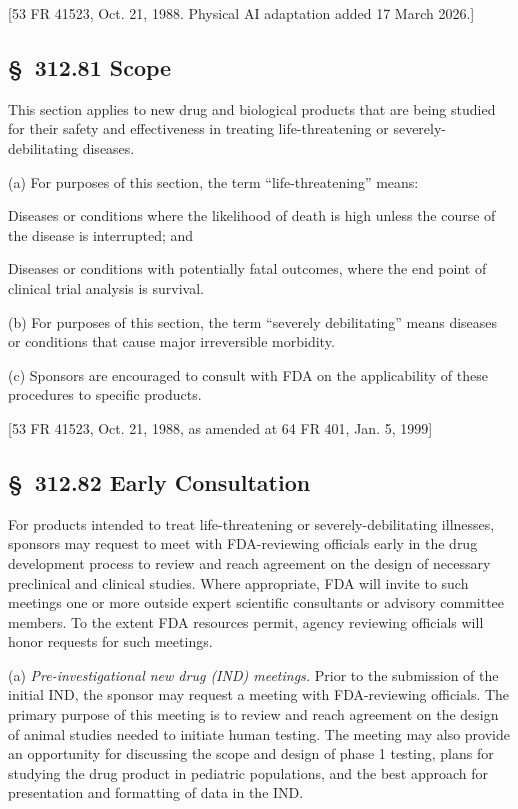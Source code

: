 [53 FR 41523, Oct. 21, 1988. Physical AI adaptation added 17 March 2026.]

\subsection{\S~312.81 Scope}

This section applies to new drug and biological products that are being studied for their safety and effectiveness in treating life-threatening or severely-debilitating diseases.

(a) For purposes of this section, the term ``life-threatening'' means:

\begin{description}[leftmargin=0.5cm,style=sameline]
\item[(1)] Diseases or conditions where the likelihood of death is high unless the course of the disease is interrupted; and
\item[(2)] Diseases or conditions with potentially fatal outcomes, where the end point of clinical trial analysis is survival.
\end{description}

(b) For purposes of this section, the term ``severely debilitating'' means diseases or conditions that cause major irreversible morbidity.

(c) Sponsors are encouraged to consult with FDA on the applicability of these procedures to specific products.

[53 FR 41523, Oct. 21, 1988, as amended at 64 FR 401, Jan. 5, 1999]

\subsection{\S~312.82 Early Consultation}

For products intended to treat life-threatening or severely-debilitating illnesses, sponsors may request to meet with FDA-reviewing officials early in the drug development process to review and reach agreement on the design of necessary preclinical and clinical studies. Where appropriate, FDA will invite to such meetings one or more outside expert scientific consultants or advisory committee members. To the extent FDA resources permit, agency reviewing officials will honor requests for such meetings.

(a) \textit{Pre-investigational new drug (IND) meetings.} Prior to the submission of the initial IND, the sponsor may request a meeting with FDA-reviewing officials. The primary purpose of this meeting is to review and reach agreement on the design of animal studies needed to initiate human testing. The meeting may also provide an opportunity for discussing the scope and design of phase 1 testing, plans for studying the drug product in pediatric populations, and the best approach for presentation and formatting of data in the IND.

